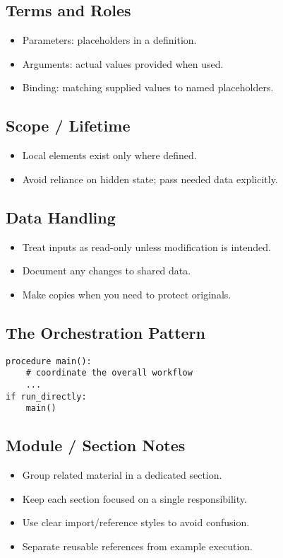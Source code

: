 \documentclass[11pt]{article}
\begin{document}
\subsection*{Terms and Roles}
\begin{itemize}\itemsep2pt
  \item Parameters: placeholders in a definition.
  \item Arguments: actual values provided when used.
  \item Binding: matching supplied values to named placeholders.
\end{itemize}

\subsection*{Scope / Lifetime}
\begin{itemize}\itemsep2pt
  \item Local elements exist only where defined.
  \item Avoid reliance on hidden state; pass needed data explicitly.
\end{itemize}

\subsection*{Data Handling}
\begin{itemize}\itemsep2pt
  \item Treat inputs as read-only unless modification is intended.
  \item Document any changes to shared data.
  \item Make copies when you need to protect originals.
\end{itemize}

\subsection*{The Orchestration Pattern}
\begin{framed}\small
\begin{verbatim}
procedure main():
    # coordinate the overall workflow
    ...
if run_directly:
    main()
\end{verbatim}
\end{framed}

\subsection*{Module / Section Notes}
\begin{itemize}\itemsep2pt
  \item Group related material in a dedicated section.
  \item Keep each section focused on a single responsibility.
  \item Use clear import/reference styles to avoid confusion.
  \item Separate reusable references from example execution.
\end{itemize}
\end{document}
